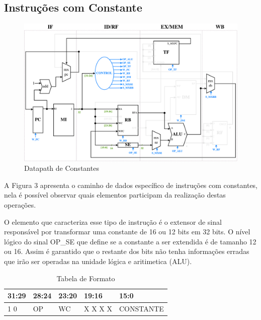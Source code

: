 \documentclass{report}
\begin{document}
\subsection{Instruções com Constante}
\begin{figure}[H]
\centering
\includegraphics[width=\textwidth]{./pictures/DatapathCONS.pdf}
\caption{Datapath de Constantes}
\end{figure}
A Figura 3 apresenta o caminho de dados específico de instruções com constantes, nela é possível observar quais elementos participam da realização destas operações.\newline

O elemento que caracteriza esse tipo de instrução é o extensor de sinal responsável por transformar uma constante de 16 ou 12 bits em 32 bits. O nível lógico do sinal OP\_SE que define se a constante a ser extendida é de tamanho 12 ou 16. Assim é garantido que o restante dos bits não tenha informações erradas que irão ser operadas na unidade lógica e aritimetica (ALU).

\FloatBarrier
\begin{table}[H]
  \begin{center}
  \renewcommand{\arraystretch}{1.39}
    \begin{tabular}[pos]{|>{\centering\arraybackslash}m{35pt}|>{\centering\arraybackslash}m{57pt}|>{\centering\arraybackslash}m{46pt}|>{\centering\arraybackslash}m{46pt}|>{\centering\arraybackslash}m{181pt}|} \hline
      \cellcolor[gray]{0.9}\textbf{31:29} & \cellcolor[gray]{0.9}\textbf{28:24} & \cellcolor[gray]{0.9}\textbf{23:20} & \cellcolor[gray]{0.9}\textbf{19:16} & \cellcolor[gray]{0.9}\textbf{15:0} \\ \hline
        0 1 0       & OP        & WC        & X X X X       & CONSTANTE \\ \hline
    \end{tabular}
    \caption{Tabela de Formato}
  \end{center}
\end{table}  
\end{document}
